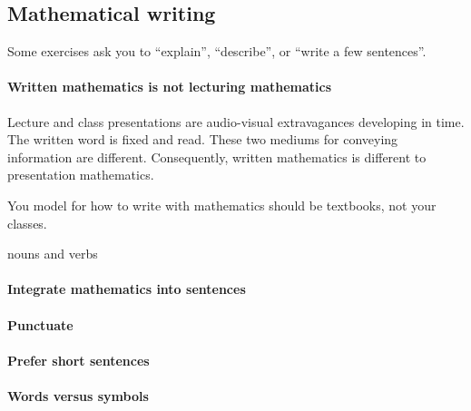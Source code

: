 \begin{draft}
\section{Mathematical writing}
\label{sec:write}

\secttoc

\begin{comment}
\cite{Higham98} Chapters 3 and~4: dos and don'ts; etc.
\cite{Zobel04}
\end{comment}

Some exercises ask you to ``explain'', ``describe'', or ``write a few sentences''.

\paragraph{Written mathematics is not lecturing mathematics}
Lecture and class presentations are audio-visual extravagances developing in time.
The written word is fixed and read.
These two mediums for conveying information are different.
Consequently, written mathematics is different to presentation mathematics.

You model for how to write with mathematics should be textbooks, not your classes.



nouns and verbs



\paragraph{Integrate mathematics into sentences}



\paragraph{Punctuate}



\paragraph{Prefer short sentences}



\paragraph{Words versus symbols}




\end{draft}
